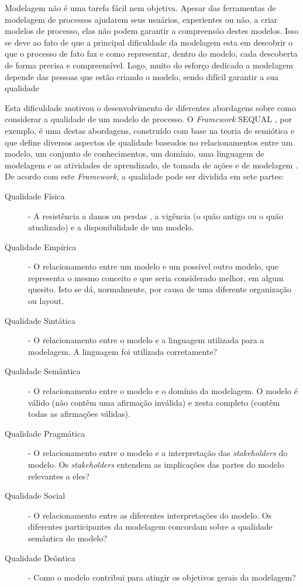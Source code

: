 \documentclass[12pt]{article}
\begin{document}
Modelagem não é uma tarefa fácil nem objetiva. Apesar das ferramentas de modelagem de processos ajudarem seus usuários, experientes ou não, a criar modelos de processo, elas não podem garantir a compreensão destes modelos. Isso se deve ao fato de que a principal dificuldade da modelagem esta em descobrir o que o processo de fato faz e como representar, dentro do modelo, cada descoberta de forma precisa e compreensível. Logo, muito do esforço dedicado a modelagem depende das pessoas que estão criando o modelo, sendo difícil garantir a sua qualidade \cite{Mendling2010a}

Esta dificuldade motivou o desenvolvimento de diferentes abordagens sobre como considerar a qualidade de um modelo de processo. O \textit{Framework} SEQUAL \cite{Krogstie2006,Lindland1994}, por exemplo, é uma destas abordagens, construído com base na teoria de semiótica e que define diversos aspectos de qualidade baseados no relacionamentos entre um modelo, um conjunto de conhecimentos, um domínio, uma linguagem de modelagem e as atividades de aprendizado, de tomada de ações e de modelagem \cite{Mendling2007}. De acordo com este \textit{Framework}, a qualidade pode ser dividida em sete partes:

\begin{description}
	\item [Qualidade Física] - A resistência a danos ou perdas , a vigência (o quão antigo ou o quão atualizado) e a disponibilidade de um modelo.
	\item [Qualidade Empírica] - O relacionamento entre um modelo e um possível outro modelo, que representa o mesmo conceito e que seria considerado melhor, em algum quesito. Isto se dá, normalmente, por causa de uma diferente organização ou layout.
	\item [Qualidade Sintática] - O relacionamento entre o modelo e a linguagem utilizada para a modelagem. A linguagem foi utilizada corretamente?
	\item [Qualidade Semântica] - O relacionamento entre o modelo e o domínio da modelagem. O modelo é válido (não contêm uma afirmação inválida) e xesta completo (contêm todas as afirmações válidas).
	\item [Qualidade Pragmática] - O relacionamento entre o modelo e a interpretação das \textit{stakeholders} do modelo. Os \textit{stakeholders} entendem as implicações das partes do modelo relevantes a eles?
	\item [Qualidade Social] - O relacionamento entre as diferentes interpretações do modelo. Os diferentes participantes da modelagem concordam sobre a qualidade semântica do modelo?
	\item [Qualidade Deôntica] - Como o modelo contribui para atingir os objetivos gerais da modelagem?
\end{description}
\end{document}
